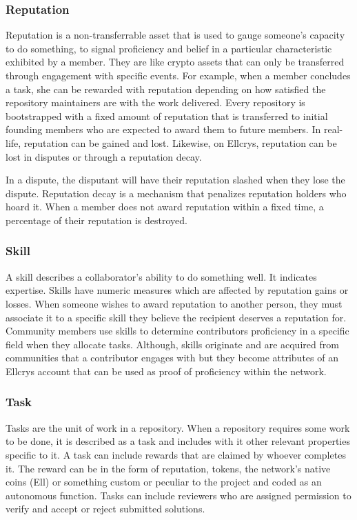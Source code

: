 \subsubsection{Reputation}
Reputation is a non-transferrable asset that is used to gauge someone's capacity to do something, to signal proficiency and belief in a particular characteristic exhibited by a member. They are like crypto assets that can only be transferred through engagement with specific events. For example, when a member concludes a task, she can be rewarded with reputation depending on how satisfied the repository maintainers are with the work delivered. Every repository is bootstrapped with a fixed amount of reputation that is transferred to initial founding members who are expected to award them to future members. In real-life, reputation can be gained and lost. Likewise, on Ellcrys, reputation can be lost in disputes or through a reputation decay.

In a dispute, the disputant will have their reputation slashed when they lose the dispute. Reputation decay is a mechanism that penalizes reputation holders who hoard it. When a member does not award reputation within a fixed time, a percentage of their reputation is destroyed.

\subsubsection{Skill}
A skill describes a collaborator’s ability to do something well. It indicates expertise. Skills have numeric measures which are affected by reputation gains or losses. When someone wishes to award reputation to another person, they must associate it to a specific skill they believe the recipient deserves a reputation for. Community members use skills to determine contributors proficiency in a specific field when they allocate tasks. Although, skills originate and are acquired from communities that a contributor engages with but they become attributes of an Ellcrys account that can be used as proof of proficiency within the network.

\subsubsection{Task}
Tasks are the unit of work in a repository. When a repository requires some work to be done, it is described as a task and includes with it other relevant properties specific to it. A task can include rewards that are claimed by whoever completes it. The reward can be in the form of reputation, tokens, the network’s native coins (Ell) or something custom or peculiar to the project and coded as an autonomous function. Tasks can include reviewers who are assigned permission to verify and accept or reject submitted solutions.

